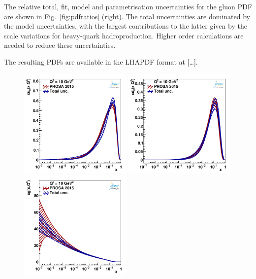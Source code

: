\documentclass[12pt]{article}
\begin{document}
The relative total, fit, model and parametrisation uncertainties for the gluon PDF are shown in Fig.~\ref{fig:pdfratios} (right). The total uncertainties are dominated by the model uncertainties, with the largest contributions to the latter given by the scale variations for heavy-quark hadroproduction. Higher order calculations are needed to reduce these uncertainties.

The resulting PDFs are available in the LHAPDF format at [\dots].

\begin{figure}
    \centering
    \includegraphics[width=0.49\textwidth]{figs/q2_10_pdf_uv.pdf}
    \includegraphics[width=0.49\textwidth]{figs/q2_10_pdf_dv.pdf}\\
    \includegraphics[width=0.49\textwidth]{figs/q2_10_pdf_g.pdf}

\end{figure}
\end{document}
